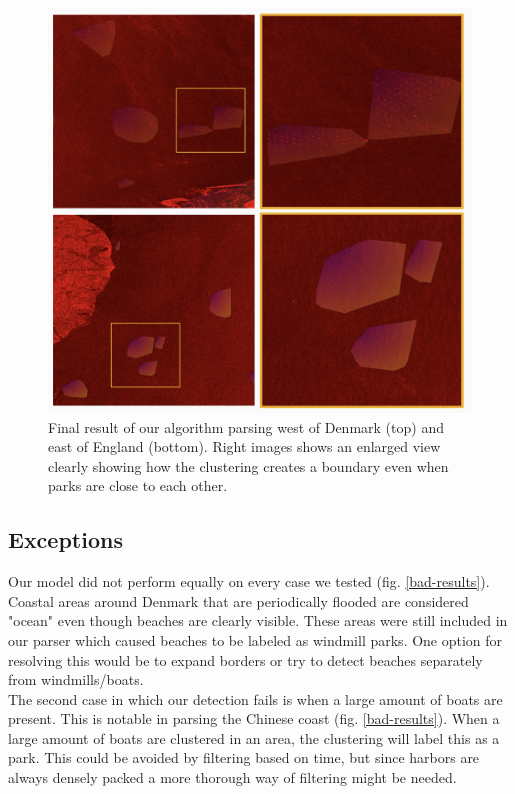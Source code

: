 \begin{figure}[ht]
\begin{center}
\centerline{\includegraphics[width=\columnwidth]{images/good-results.png}}
\caption{Final result of our algorithm parsing west of Denmark (top) and east of England (bottom). Right images shows an enlarged view clearly showing how the clustering creates a boundary even when parks are close to each other.}
\label{good-results}
\end{center}
\end{figure}

\subsection{Exceptions}

Our model did not perform equally on every case we tested (fig. \ref{bad-results}). Coastal areas around Denmark that are periodically flooded are considered "ocean" even though beaches are clearly visible. These areas were still included in our parser which caused beaches to be labeled as windmill parks. One option for resolving this would be to expand borders or try to detect beaches separately from windmills/boats.\\

The second case in which our detection fails is when a large amount of boats are present. This is notable in parsing the Chinese coast (fig. \ref{bad-results}). When a large amount of boats are clustered in an area, the clustering will label this as a park. This could be avoided by filtering based on time, but since harbors are always densely packed a more thorough way of filtering might be needed.

